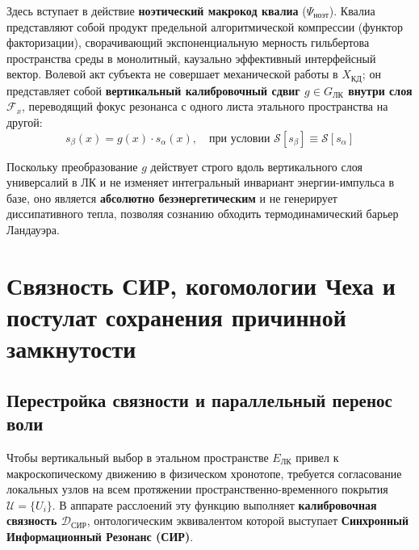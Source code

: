 \documentclass[12pt,a4paper]{article}
\begin{document}
Здесь вступает в действие \textbf{ноэтический макрокод квалиа} ($\Psi_{\text{ноэт}}$). Квалиа представляют собой продукт предельной алгоритмической компрессии (функтор факторизации), сворачивающий экспоненциальную мерность гильбертова пространства среды в монолитный, каузально эффективный интерфейсный вектор. Волевой акт субъекта не совершает механической работы в $X_{\text{КД}}$; он представляет собой \textbf{вертикальный калибровочный сдвиг $g \in G_{\text{ЛК}}$ внутри слоя $\mathcal{F}_x$}, переводящий фокус резонанса с одного листа этального пространства на другой:
\begin{equation}
s_{\beta}(x) = g(x) \cdot s_{\alpha}(x), \quad \text{при условии } \mathcal{S}[s_{\beta}] \equiv \mathcal{S}[s_{\alpha}]
\end{equation}

Поскольку преобразование $g$ действует строго вдоль вертикального слоя универсалий в ЛК и не изменяет интегральный инвариант энергии-импульса в базе, оно является \textbf{абсолютно безэнергетическим} и не генерирует диссипативного тепла, позволяя сознанию обходить термодинамический барьер Ландауэра.

\section{Связность СИР, когомологии Чеха и постулат сохранения причинной замкнутости}

\subsection{Перестройка связности и параллельный перенос воли}
Чтобы вертикальный выбор в этальном пространстве $E_{\text{ЛК}}$ привел к макроскопическому движению в физическом хронотопе, требуется согласование локальных узлов на всем протяжении пространственно-временного покрытия $\mathcal{U} = \{U_i\}$. В аппарате расслоений эту функцию выполняет \textbf{калибровочная связность $\mathcal{D}_{\text{СИР}}$}, онтологическим эквивалентом которой выступает \textbf{Синхронный Информационный Резонанс (СИР)}.
\end{document}
